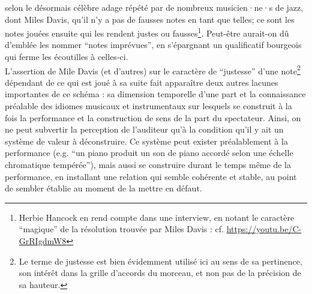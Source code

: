 selon le désormais célèbre adage répété par de nombreux musicien·ne·s de jazz, dont Miles Davis, qu'il n'y a pas de fausses notes en tant que telles; ce sont les notes jouées ensuite qui les rendent justes ou fausses\footnote{Herbie Hancock en rend compte dans une interview, en notant le caractère ``magique'' de la résolution trouvée par Miles Davis :  cf. \url{https://youtu.be/C-GrRIgdmW8}}. Peut-être aurait-on dû d'emblée les nommer ``notes imprévues'', en s'épargnant un qualificatif bourgeois qui ferme les écoutilles à celles-ci.\\
\indent L'assertion de Mile Davis (et d'autres) sur le caractère de ``justesse'' d'une note\footnote{Le terme de justesse est bien évidemment utilisé ici au sens de sa pertinence, son intérêt dans la grille d'accords du morceau, et non pas de la précision de sa hauteur. } dépendant de ce qui est joué à sa suite fait apparaître deux autres lacunes importantes de ce schéma : sa dimension temporelle d'une part et la connaissance préalable des idiomes musicaux et instrumentaux sur lesquels se construit à la fois la performance et la construction de sens de la part du spectateur. Ainsi, on ne peut subvertir la perception de l'auditeur qu'à la condition qu'il y ait un système de valeur à déconstruire. Ce système peut exister préalablement à la performance (e.g. ``un piano produit un son de piano accordé selon une échelle chromatique tempérée''), mais aussi se construire durant le temps même de la performance, en installant une relation qui semble cohérente et stable, au point de sembler établie au moment de la mettre en défaut.\\

